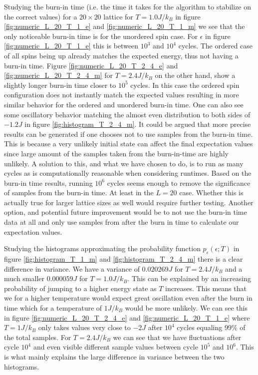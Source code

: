\documentclass[english,notitlepage,reprint,nofootinbib]{revtex4-1}  %
\begin{document}
Studying the burn-in time (i.e. the time it takes for the algorithm to stabilize on the correct values) for a $20 \times 20$ lattice for $T=1.0 J/k_B$ in figure \ref{fig:numeric_L_20_T_1_e} and \ref{fig:numeric_L_20_T_1_m} we see that the only noticeable burn-in time is for the unordered spin case. For $\epsilon$ in figure \ref{fig:numeric_L_20_T_1_e} this is between $10^3$ and $10^4$ cycles. The ordered case of all spins being up already matches the expected energy, thus not having a burn-in time. Figure \ref{fig:numeric_L_20_T_2_4_e} and \ref{fig:numeric_L_20_T_2_4_m} for $T=2.4 J/k_B$ on the other hand, show a slightly longer burn-in time closer to $10^5$ cycles. In this case the ordered spin configuration does not instantly match the expected values resulting in more similar behavior for the ordered and unordered burn-in time. One can also see some oscillatory behavior matching the almost even distribution to both sides of $-1.2 J$ in figure \ref{fig:histogram_T_2_4_m}.
It could be argued that more precise results can be generated if one chooses not to use samples from the burn-in time. This is because a very unlikely initial state can affect the final expectation values since large amount of the samples taken from the burn-in-time are highly unlikely. A solution to this, and what we have chosen to do, is to run as many cycles as is computationally reasonable when considering runtimes. Based on the burn-in time results, running $10^6$ cycles seems enough to remove the significance of samples from the burn-in time. At least in the $L=20$ case. Whether this is actually true for larger lattice sizes as well would require further testing. Another option, and potential future improvement would be to not use the burn-in time data at all and only use samples from after the burn in time to calculate our expectation values.

Studying the histograms approximating the probability function $p_{\epsilon}(\epsilon;T)$ in figure \ref{fig:histogram_T_1_m} and \ref{fig:histogram_T_2_4_m} there is a clear difference in variance. We have a variance of $0.020269 J$ for $T=2.4J/k_B$ and a much smaller $0.000059 J$ for $T=1.0J/k_B$. This can be explained by an increasing probability of jumping to a higher energy state as $T$ increases. This means that we for a higher temperature would expect great oscillation even after the burn in time which for a temperature of $1 J/k_B$ would be more unlikely. We can see this in figure \ref{fig:numeric_L_20_T_2_4_e} and \ref{fig:numeric_L_20_T_1_e} where $T=1J/k_B$ only takes values very close to $-2J$ after $10^4$ cycles equaling 99\% of the total samples. For $T=2.4J/k_B$ we can see that we have fluctuations after cycle $10^4$ and even visible different sample values between cycle $10^5$ and $10^6$. This is what mainly explains the large difference in variance between the two histograms.
\end{document}
